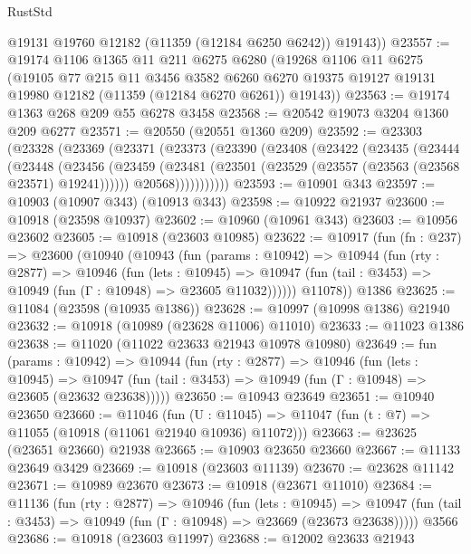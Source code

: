 \begin{lexlean}{RustStd}
\begin{coremodule}
{{{{{{{{{{{{{{{{{{{        @19131
        @19760
        @12182
        (@11359 (@12184 @6250 @6242))
        @19143))
@23557 := @19174
    @1106
    @1365
    @11
    @211
    @6275
    @6280
    (@19268
      @1106
      @11
      @6275
      (@19105
        @77
        @215
        @11
        @3456
        @3582
        @6260
        @6270
        @19375
        @19127
        @19131
        @19980
        @12182
        (@11359 (@12184 @6270 @6261))
        @19143))
@23563 := @19174 @1363 @268 @209 @55 @6278 @3458
@23568 := @20542 @19073 @3204 @1360 @209 @6277
@23571 := @20550 (@20551 @1360 @209)
@23592 := @23303
    (@23328
      (@23369
        (@23371
          (@23373
            (@23390
              (@23408
                (@23422
                  (@23435
                    (@23444
                      (@23448
                        (@23456
                          (@23459
                            (@23481 (@23501 (@23529 (@23557 (@23563 (@23568 @23571) @19241))))))
                          @20568)))))))))))
@23593 := @10901 @343
@23597 := @10903 (@10907 @343) (@10913 @343)
@23598 := @10922 @21937
@23600 := @10918 (@23598 @10937)
@23602 := @10960 (@10961 @343)
@23603 := @10956 @23602
@23605 := @10918 (@23603 @10985)
@23622 := @10917
    (fun (fn : @237) =>
    @23600
      (@10940
        (@10943
          (fun (params : @10942) =>
          @10944
            (fun (rty : @2877) =>
            @10946
              (fun (lets : @10945) =>
              @10947 (fun (tail : @3453) => @10949 (fun (Γ : @10948) => @23605 @11032))))))
        @11078))
    @1386
@23625 := @11084 (@23598 (@10935 @1386))
@23628 := @10997 (@10998 @1386) @21940
@23632 := @10918 (@10989 (@23628 @11006) @11010)
@23633 := @11023 @1386
@23638 := @11020 (@11022 @23633 @21943 @10978 @10980)
@23649 := fun (params : @10942) =>
  @10944
    (fun (rty : @2877) =>
    @10946
      (fun (lets : @10945) =>
      @10947 (fun (tail : @3453) => @10949 (fun (Γ : @10948) => @23605 (@23632 @23638)))))
@23650 := @10943 @23649
@23651 := @10940 @23650
@23660 := @11046
    (fun (U : @11045) => @11047 (fun (t : @7) => @11055 (@10918 (@11061 @21940 @10936) @11072)))
@23663 := @23625 (@23651 @23660) @21938
@23665 := @10903 @23650 @23660
@23667 := @11133 @23649 @3429
@23669 := @10918 (@23603 @11139)
@23670 := @23628 @11142
@23671 := @10989 @23670
@23673 := @10918 (@23671 @11010)
@23684 := @11136
    (fun (rty : @2877) =>
    @10946
      (fun (lets : @10945) =>
      @10947 (fun (tail : @3453) => @10949 (fun (Γ : @10948) => @23669 (@23673 @23638)))))
    @3566
@23686 := @10918 (@23603 @11997)
@23688 := @12002 @23633 @21943
}}}}}}}}}}}}}}}}}}}
\end{coremodule}
\end{lexlean}
